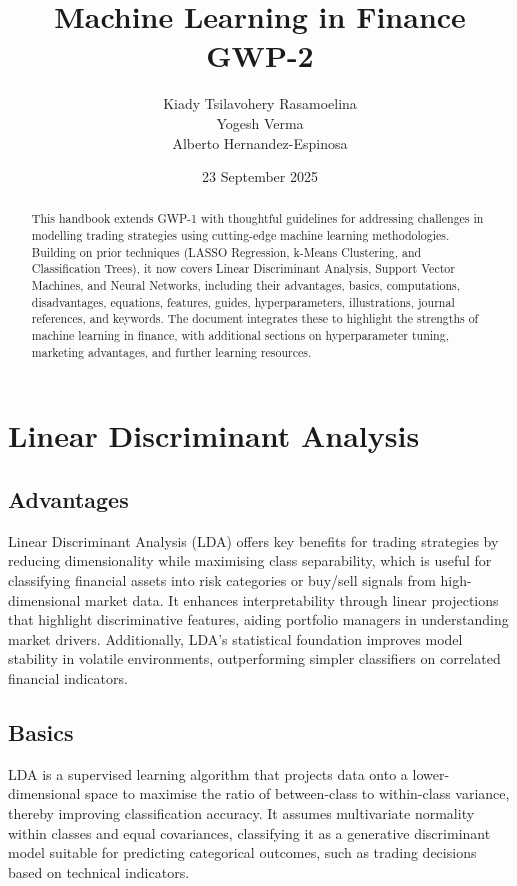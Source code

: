 \documentclass{article}
\title{Machine Learning in Finance \\
GWP-2}
\author{Kiady Tsilavohery Rasamoelina \\
Yogesh Verma \\
Alberto Hernandez-Espinosa}
\date{23 September 2025}
\begin{document}
\maketitle

\begin{abstract}
This handbook extends GWP-1 with thoughtful guidelines for addressing challenges in modelling trading strategies using cutting-edge machine learning methodologies. Building on prior techniques (LASSO Regression, k-Means Clustering, and Classification Trees), it now covers Linear Discriminant Analysis, Support Vector Machines, and Neural Networks, including their advantages, basics, computations, disadvantages, equations, features, guides, hyperparameters, illustrations, journal references, and keywords. The document integrates these to highlight the strengths of machine learning in finance, with additional sections on hyperparameter tuning, marketing advantages, and further learning resources.
\end{abstract}


\section{Linear Discriminant Analysis}

\subsection{Advantages}

Linear Discriminant Analysis (LDA) offers key benefits for trading strategies by reducing dimensionality while maximising class separability, which is useful for classifying financial assets into risk categories or buy/sell signals from high-dimensional market data. It enhances interpretability through linear projections that highlight discriminative features, aiding portfolio managers in understanding market drivers. Additionally, LDA's statistical foundation improves model stability in volatile environments, outperforming simpler classifiers on correlated financial indicators.

\subsection{Basics}

LDA is a supervised learning algorithm that projects data onto a lower-dimensional space to maximise the ratio of between-class to within-class variance, thereby improving classification accuracy. It assumes multivariate normality within classes and equal covariances, classifying it as a generative discriminant model suitable for predicting categorical outcomes, such as trading decisions based on technical indicators.
\end{document}
